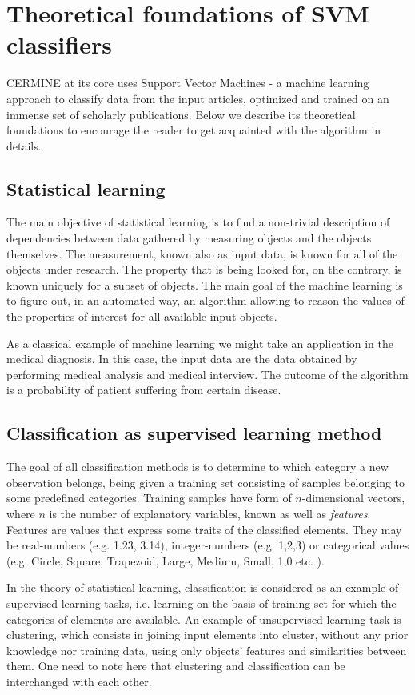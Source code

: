 \chapter{Theoretical foundations of SVM classifiers} \label{chapter:theory}
CERMINE at its core uses Support Vector Machines - a machine learning approach to classify data from the input articles, optimized and trained on an immense set of scholarly publications. Below we describe its theoretical foundations to encourage the reader to get acquainted with the algorithm in details.

\section{Statistical learning}
The main objective of statistical learning is to find a non-trivial description of dependencies between data gathered by measuring objects and the objects themselves. The measurement, known also as input data, is known for all of the objects under research. The property that is being looked for, on the contrary, is known uniquely for a subset of objects. The main goal of the machine learning is to figure out, in an automated way, an algorithm allowing to reason the values of the properties of interest for all available input objects.

As a classical example of machine learning we might take an application in the medical diagnosis. In this case, the input data are the data obtained by performing medical analysis and medical interview. The outcome of the algorithm is a probability of patient suffering from certain disease.

\section{Classification as supervised learning method}
The goal of all classification methods is to determine to which category a new observation belongs, being given a training set consisting of samples belonging to some predefined categories. Training samples have form of $n$-dimensional vectors, where $n$ is the number of explanatory variables, known as well as \textit{features}. Features are values that express some traits of the classified elements. They may be real-numbers (e.g. 1.23, 3.14), integer-numbers (e.g. 1,2,3) or categorical values (e.g. {Circle, Square, Trapezoid}, {Large, Medium, Small}, {1,0} etc. ).

In the theory of statistical learning, classification is considered as an example of supervised learning tasks, i.e. learning on the basis of training set for which the categories of elements are available. An example of unsupervised learning task is clustering, which consists in joining input elements into cluster, without any prior knowledge nor training data, using only objects' features and similarities between them. One need to note here that clustering and classification can be interchanged with each other.

